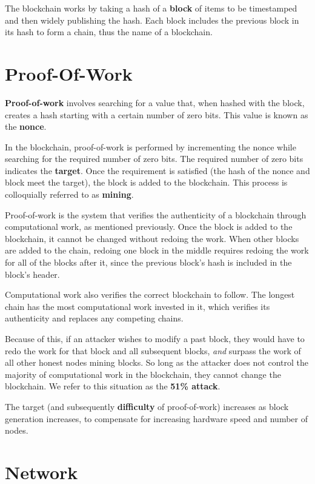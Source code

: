 \documentclass[11pt, letterpaper]{template}
\begin{document}
The blockchain works by taking a hash of a \textbf{block} of items to be timestamped and then widely publishing the hash. Each block includes the previous block in its hash to form a chain, thus the name of a blockchain.

\section{Proof-Of-Work}

\textbf{Proof-of-work} involves searching for a value that, when hashed with the block, creates a hash starting with a certain number of zero bits. This value is known as the \textbf{nonce}.

In the blockchain, proof-of-work is performed by incrementing the nonce while searching for the required number of zero bits. The required number of zero bits indicates the \textbf{target}. Once the requirement is satisfied (the hash of the nonce and block meet the target), the block is added to the blockchain. This process is colloquially referred to as \textbf{mining}.

Proof-of-work is the system that verifies the authenticity of a blockchain through computational work, as mentioned previously. Once the block is added to the blockchain, it cannot be changed without redoing the work. When other blocks are added to the chain, redoing one block in the middle requires redoing the work for all of the blocks after it, since the previous block's hash is included in the block's header.

Computational work also verifies the correct blockchain to follow. The longest chain has the most computational work invested in it, which verifies its authenticity and replaces any competing chains. 

Because of this, if an attacker wishes to modify a past block, they would have to redo the work for that block and all subsequent blocks, \emph{and} surpass the work of all other honest nodes mining blocks. So long as the attacker does not control the majority of computational work in the blockchain, they cannot change the blockchain. We refer to this situation as the \textbf{51\% attack}.

The target (and subsequently \textbf{difficulty} of proof-of-work) increases as block generation increases, to compensate for increasing hardware speed and number of nodes.

\section{Network}
\end{document}
